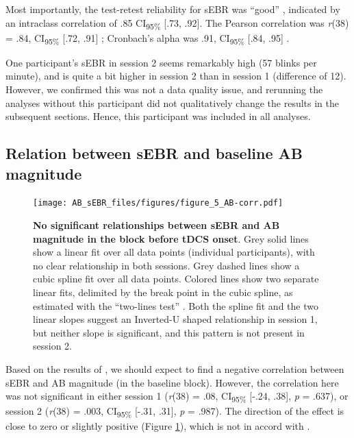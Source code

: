 \documentclass[11pt,english,]{memoir}
\begin{document}
Most importantly, the test-retest reliability for sEBR was ``good'' \autocite{Koo2016}, indicated by an intraclass correlation of .85 CI\textsubscript{95\%} {[}.73, .92{]}. The Pearson correlation was \emph{r}(38) = .84, CI\textsubscript{95\%} {[}.72, .91{]} \autocite[cf.][]{Dang2017}; Cronbach's alpha was .91, CI\textsubscript{95\%} {[}.84, .95{]} \autocite[cf.][]{Kruis2016}.

One participant's sEBR in session 2 seems remarkably high (57 blinks per minute), and is quite a bit higher in session 2 than in session 1 (difference of 12). However, we confirmed this was not a data quality issue, and rerunning the analyses without this participant did not qualitatively change the results in the subsequent sections. Hence, this participant was included in all analyses.

\hypertarget{AB_sEBR-ABmag}{%
\subsection{Relation between sEBR and baseline AB magnitude}\label{AB_sEBR-ABmag}}

\begin{figure}
\centering
\texttt{[image: AB\_sEBR\_files/figures/figure\_5\_AB-corr.pdf]}
\caption{\label{fig:fig-AB-corr}\textbf{No significant relationships between sEBR and AB magnitude in the block before tDCS onset}. Grey solid lines show a linear fit over all data points (individual participants), with no clear relationship in both sessions. Grey dashed lines show a cubic spline fit over all data points. Colored lines show two separate linear fits, delimited by the break point in the cubic spline, as estimated with the ``two-lines test'' \autocite{Simonsohn2018}. Both the spline fit and the two linear slopes suggest an Inverted-U shaped relationship in session 1, but neither slope is significant, and this pattern is not present in session 2.}
\end{figure}



Based on the results of \textcite{Colzato2008}, we should expect to find a negative correlation between sEBR and AB magnitude (in the baseline block). However, the correlation here was not significant in either session 1 (\emph{r}(38) = .08, CI\textsubscript{95\%} {[}-.24, .38{]}, \emph{p} = .637), or session 2 (\emph{r}(38) = .003, CI\textsubscript{95\%} {[}-.31, .31{]}, \emph{p} = .987). The direction of the effect is close to zero or slightly positive (Figure \ref{fig:fig-AB-corr}), which is not in accord with \textcite{Colzato2008}.
\end{document}
